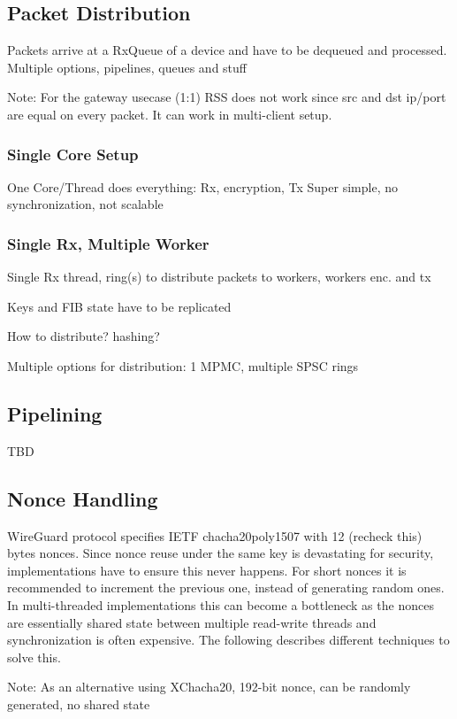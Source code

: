 \documentclass[IN,11pt,twoside,openright,master,english]{tumthesis}
\begin{document}
\subsection{Packet Distribution}
	Packets arrive at a RxQueue of a device and have to be dequeued and processed.
	Multiple options, pipelines, queues and stuff
	
	Note: For the gateway usecase (1:1) RSS does not work since src and dst ip/port are equal on every packet. It can work in multi-client setup.
	
	\subsubsection{Single Core Setup}
	One Core/Thread does everything: Rx, encryption, Tx
	Super simple, no synchronization, not scalable
	
	\subsubsection{Single Rx, Multiple Worker}
	Single Rx thread, ring(s) to distribute packets to workers, workers enc. and tx
	
	Keys and FIB state have to be replicated
	
	How to distribute? hashing?
	
	Multiple options for distribution: 1 MPMC, multiple SPSC rings
	
	\subsection{Pipelining}
	TBD
	
	\subsection{Nonce Handling}
	WireGuard protocol specifies IETF chacha20poly1507 with 12 (recheck this) bytes nonces. Since nonce reuse under the same key is devastating for security, implementations have to ensure this never happens. For short nonces it is recommended to increment the previous one, instead of generating random ones.
	In multi-threaded implementations this can become a bottleneck as the nonces are essentially shared state between multiple read-write threads and synchronization is often expensive.
	The following describes different techniques to solve this.
	
	Note: As an alternative using XChacha20, 192-bit nonce, can be randomly generated, no shared state
		
\end{document}
